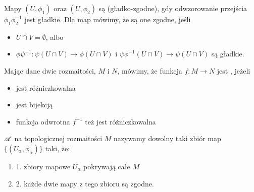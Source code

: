 \begin{definition}
Mapy $(U, \phi_1)$ oraz $(U, \phi_2)$ są  (gładko-zgodne), gdy odwzorowanie przejścia $\phi_1\phi_2^{-1}$ jest gładkie. Dla map  mówimy, że są one zgodne, jeśli 
\begin{itemize}
    \item $U\cap V=\emptyset$, albo
    \item $\phi\psi^{-1}:\psi(U\cap V)\to \phi(U\cap V)$ i $\psi\phi^{-1}(U\cap V)\to \psi(U\cap V)$ są gładkie.
\end{itemize}
\end{definition}
%
%

\begin{definition}[dyfeomorfizm]
Mając dane dwie rozmaitości, $M$ i $N$, mówimy, że funkcja $f:M\to N$ jest , jeżeli
\begin{itemize}
    \item jest różniczkowalna
    \item jest bijekcją
    \item funkcja odwrotna $f^{-1}$ też jest różniczkowalna
\end{itemize}
\end{definition}


\begin{definition}
     $\mathcal{A}$ na topologicznej rozmaitości $M$ nazywamy dowolny taki zbiór map $\{(U_\alpha,\phi_\alpha)\}$ taki, że:
    \begin{enumerate}
        \item 1. zbiory mapowe $U_\alpha$ pokrywają całe $M$
        \item 2. każde dwie mapy z tego zbioru są zgodne.
    \end{enumerate}
\end{definition}


